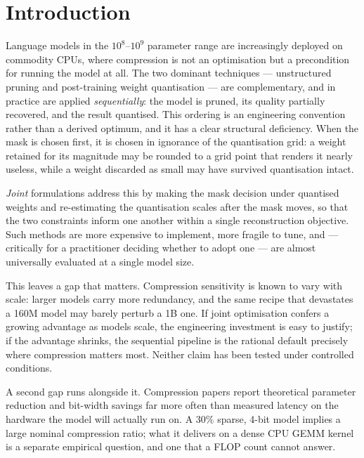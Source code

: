 \section{Introduction}
\label{sec:intro}

Language models in the $10^{8}$--$10^{9}$ parameter range are increasingly deployed on
commodity CPUs, where compression is not an optimisation but a precondition for running the
model at all. The two dominant techniques --- unstructured pruning and post-training weight
quantisation --- are complementary, and in practice are applied \emph{sequentially}: the
model is pruned, its quality partially recovered, and the result quantised. This ordering is
an engineering convention rather than a derived optimum, and it has a clear structural
deficiency. When the mask is chosen first, it is chosen in ignorance of the quantisation
grid: a weight retained for its magnitude may be rounded to a grid point that renders it
nearly useless, while a weight discarded as small may have survived quantisation intact.

\emph{Joint} formulations address this by making the mask decision under quantised weights
and re-estimating the quantisation scales after the mask moves, so that the two constraints
inform one another within a single reconstruction objective. Such methods are more expensive
to implement, more fragile to tune, and --- critically for a practitioner deciding whether to
adopt one --- are almost universally evaluated at a single model size.

This leaves a gap that matters. Compression sensitivity is known to vary with scale: larger
models carry more redundancy, and the same recipe that devastates a 160M model may barely
perturb a 1B one. If joint optimisation confers a growing advantage as models scale, the
engineering investment is easy to justify; if the advantage shrinks, the sequential pipeline
is the rational default precisely where compression matters most. Neither claim has been
tested under controlled conditions.

A second gap runs alongside it. Compression papers report theoretical parameter reduction and
bit-width savings far more often than measured latency on the hardware the model will
actually run on. A $30\%$ sparse, 4-bit model implies a large nominal compression ratio; what
it delivers on a dense CPU GEMM kernel is a separate empirical question, and one that a FLOP
count cannot answer.

